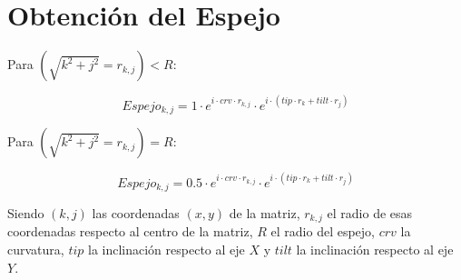 \documentclass[twoside]{article}
\begin{document}

\newpage

	    \appendix

		    	\section{Obtención del Espejo}
		    		\label{appen:Espejo}

					Para  $(\sqrt{k^2+j^2}=r_{k,j}) < R$:

						\begin{equation}
							Espejo_{k, j} = 1 \cdot e^{i\cdot crv \cdot r_{k,j}} \cdot e^{i\cdot (tip\cdot r_k + tilt \cdot r_j)}
						\end{equation}
						
					Para $(\sqrt{k^2+j^2}=r_{k,j}) = R$:

						\begin{equation}
							Espejo_{k,j} = 0.5 \cdot e^{i\cdot crv \cdot r_{k,j}} \cdot e^{i\cdot (tip\cdot r_k + tilt \cdot r_j)}
							\label{eq:Espejo}
						\end{equation}	

					Siendo $(k, j)$ las coordenadas $(x, y)$ de la matriz, $r_{k, j}$ el radio de esas coordenadas respecto al centro de la matriz, $R$ el radio del espejo, $crv$ la curvatura, $tip$ la inclinación respecto al eje $X$ y $tilt$ la inclinación respecto al eje $Y$.
	    		

	
	
\end{document}
